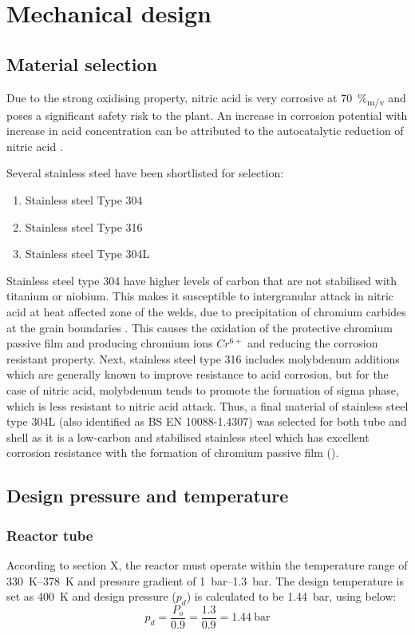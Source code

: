 \section{Mechanical design}
\subsection{Material selection}
Due to the strong oxidising property, nitric acid is very corrosive at \SI{70}{\%_{m/v}} and poses a significant safety risk to the plant. An increase in corrosion potential with increase in acid concentration can be attributed to the autocatalytic reduction of nitric acid
\cite{suresh_corrosion_nodate}. 

Several stainless steel have been shortlisted for selection: 
\begin{enumerate}
    \item Stainless steel Type 304
    \item Stainless steel Type 316
    \item Stainless steel Type 304L
\end{enumerate}

Stainless steel type 304 have higher levels of carbon that are not stabilised with titanium or niobium. This makes it susceptible to intergranular attack in nitric acid at heat affected zone of the welds, due to precipitation of chromium carbides at the grain boundaries \cite{cm_selection_nodate}. This causes the oxidation of the protective chromium passive film and producing chromium ions $Cr^{6+}$ and reducing the corrosion resistant property. Next, stainless steel type 316 includes molybdenum additions which are generally known to improve resistance to acid corrosion, but for the case of nitric acid, molybdenum tends to promote the formation of sigma phase, which is less resistant to nitric acid attack. Thus, a final material of stainless steel type 304L (also identified as BS EN 10088-1.4307) was selected for both tube and shell as it is a low-carbon and stabilised stainless steel which has excellent corrosion resistance with the formation of chromium passive film ().

\subsection{Design pressure and temperature}
\subsubsection{Reactor tube}
According to section X, the reactor must operate within the temperature range of \SIrange{330}{378}{\K} and pressure gradient of \SIrange{1}{1.3}{\bar}. The design temperature is set as \SI{400}{\K} and design pressure ($p_d$) is calculated to be \SI{1.44}{\bar}, using  below:
\begin{equation}
    p_d = \frac{P_o}{0.9} = \frac{1.3}{0.9} = \SI{1.44}{\bar}
    \label{eqn:designpressure}
\end{equation}

